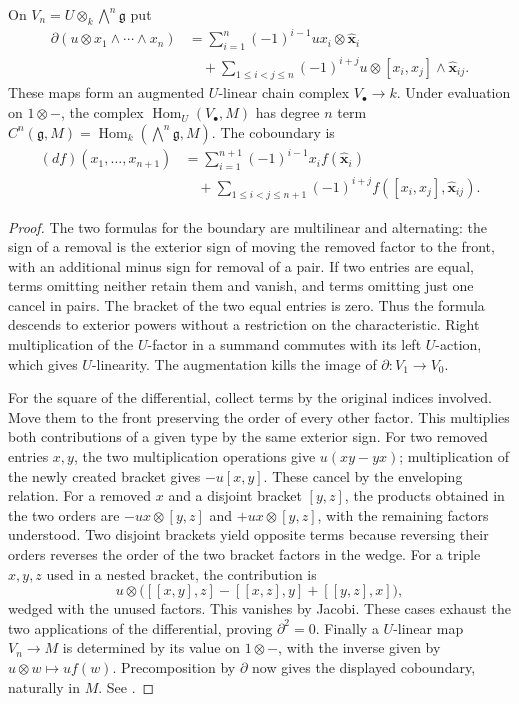 \begin{proposition}\label{res:A06}
On \(V_n=U\otimes_k \bigwedge^n\mathfrak g\) put
\begin{align*}
 \partial(u\otimes x_1\wedge\cdots\wedge x_n)
 &=\sum_{i=1}^n (-1)^{i-1}u x_i\otimes
                       \widehat{\boldsymbol x}_i\\
 &\quad+\sum_{1\leq i<j\leq n}(-1)^{i+j}u\otimes
                   [x_i,x_j]\wedge \widehat{\boldsymbol x}_{ij}.
\end{align*}
These maps form an augmented \(U\)-linear chain complex \(V_\bullet\to k\).
Under evaluation on \(1\otimes-\), the complex
\(\operatorname{Hom}_U(V_\bullet,M)\) has degree \(n\) term
\(C^n(\mathfrak g,M)=
 \operatorname{Hom}_k(\bigwedge^n\mathfrak g,M)\).
The coboundary is
\begin{align*}
 (df)(x_1,\ldots,x_{n+1})
 &=\sum_{i=1}^{n+1}(-1)^{i-1}x_i f(\widehat{\boldsymbol x}_i)\\
 &\quad+\sum_{1\leq i<j\leq n+1}(-1)^{i+j}
                 f([x_i,x_j],\widehat{\boldsymbol x}_{ij}).
\end{align*}
\end{proposition}

\begin{proof}
The two formulas for the boundary are multilinear and alternating:
the sign of a removal is the exterior sign of moving the removed
factor to the front, with an additional minus sign for removal of
a pair. If two entries are equal, terms omitting neither retain
them and vanish, and terms omitting just one cancel in pairs.
The bracket of the two equal entries is zero. Thus the formula
descends to exterior powers without a restriction on the
characteristic. Right multiplication of the \(U\)-factor in a
summand commutes with its left \(U\)-action, which gives
\(U\)-linearity. The augmentation kills the image of \(\partial:V_1\to V_0\).

For the square of the differential, collect terms by the original
indices involved. Move them to the front preserving the order of
every other factor. This multiplies both contributions of a given
type by the same exterior sign. For two removed entries \(x,y\),
the two multiplication operations give \(u(xy-yx)\); multiplication
of the newly created bracket gives \(-u[x,y]\). These cancel by
the enveloping relation. For a removed \(x\) and a disjoint
bracket \([y,z]\), the products obtained in the two orders are
\(-ux\otimes[y,z]\) and \(+ux\otimes[y,z]\), with the remaining
factors understood. Two disjoint brackets yield opposite terms
because reversing their orders reverses the order of the two
bracket factors in the wedge. For a triple \(x,y,z\) used in a
nested bracket, the contribution is
\[
 u\otimes\bigl([[x,y],z]-[[x,z],y]+[[y,z],x]\bigr),
\]
wedged with the unused factors. This vanishes by Jacobi. These
cases exhaust the two applications of the differential, proving
\(\partial^2=0\). Finally a \(U\)-linear map \(V_n\to M\) is
determined by its value on \(1\otimes-\), with the inverse given
by \(u\otimes w\mapsto u f(w)\). Precomposition by \(\partial\)
now gives the displayed coboundary, naturally in \(M\).
See \cite[Section 7.7]{weibel}.
\end{proof}


